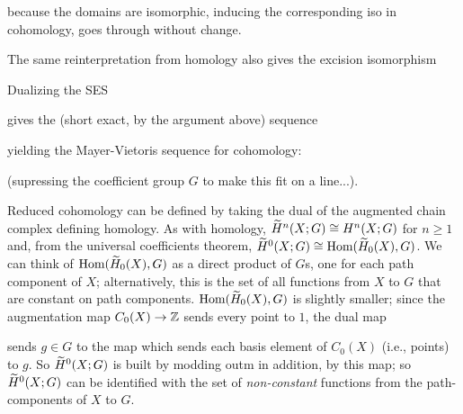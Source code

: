 \ssk

because the domains are isomorphic, inducing the corresponding
iso in cohomology, goes through without change. 

\vfill
\eject

The same reinterpretation from homology also gives
the excision isomorphism 

\ssk


\ssk

Dualizing the SES 

\ssk


\ssk

gives the (short exact, by the argument above) sequence

\ssk


\ssk

yielding the Mayer-Vietoris sequence for cohomology:

\ssk


\ssk

(supressing the coefficient group $G$ to make this fit on a line...). 

\ssk

Reduced cohomology can be defined by taking the dual of the augmented chain complex defining homology.
As with homology, $\widetilde{H}^n(X;G)\cong H^n(X;G)$ for $n\geq 1$ and, from the universal coefficients 
theorem, $\widetilde{H}^0(X;G)\cong \text{Hom}(\widetilde{H}_0(X),G)$.
We can think of $\text{Hom}(\widetilde{H}_0(X),G)$ as a direct product of $G$s,
one for each path component of $X$; alternatively, this is the set of all functions from $X$ to $G$ that are
constant on path components. $\text{Hom}(\widetilde{H}_0(X),G)$ is slightly smaller; since the augmentation map 
$C_0(X)\rightarrow {\Bbb Z}$ sends every point to $1$, the dual map 

\ssk


\ssk

sends $g\in G$ to the map which sends each basis element of $C_0(X)$ (i.e., points) to $g$. So $\widetilde{H}^0(X;G)$
is built by modding outm in addition, by this map; so $\widetilde{H}^0(X;G)$ can be identified with the set
of {\it non-constant} functions from the path-components of $X$ to $G$.


